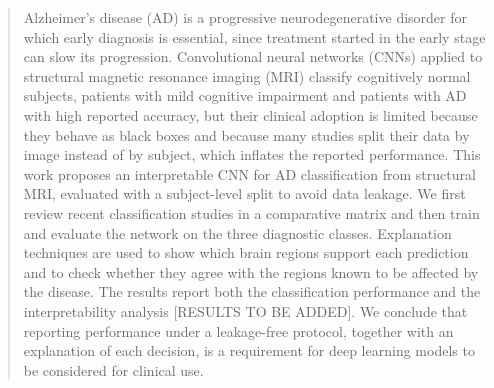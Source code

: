 \begin{abstract}
Alzheimer's disease (AD) is a progressive neurodegenerative disorder for which early diagnosis is essential, since treatment started in the early stage can slow its progression. Convolutional neural networks (CNNs) applied to structural magnetic resonance imaging (MRI) classify cognitively normal subjects, patients with mild cognitive impairment and patients with AD with high reported accuracy, but their clinical adoption is limited because they behave as black boxes and because many studies split their data by image instead of by subject, which inflates the reported performance. This work proposes an interpretable CNN for AD classification from structural MRI, evaluated with a subject-level split to avoid data leakage. We first review recent classification studies in a comparative matrix and then train and evaluate the network on the three diagnostic classes. Explanation techniques are used to show which brain regions support each prediction and to check whether they agree with the regions known to be affected by the disease. The results report both the classification performance and the interpretability analysis [RESULTS TO BE ADDED]. We conclude that reporting performance under a leakage-free protocol, together with an explanation of each decision, is a requirement for deep learning models to be considered for clinical use.
\end{abstract}
